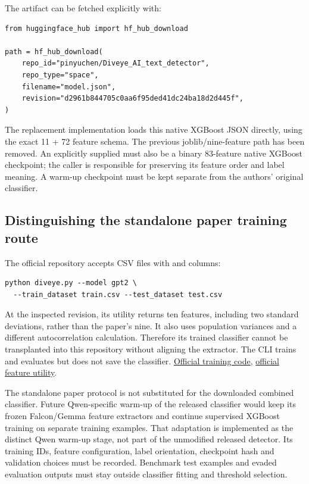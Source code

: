 The artifact can be fetched explicitly with:

\begin{Verbatim}
from huggingface_hub import hf_hub_download

path = hf_hub_download(
    repo_id="pinyuchen/Diveye_AI_text_detector",
    repo_type="space",
    filename="model.json",
    revision="d2961b844705c0aa6f95ded41dc24ba18d2d445f",
)
\end{Verbatim}

The replacement implementation loads this native XGBoost JSON directly,
using the exact 11 + 72 feature schema. The previous joblib/nine-feature
path has been removed. An explicitly supplied
\texttt{} must also be a binary 83-feature
native XGBoost checkpoint; the caller is responsible for preserving its
feature order and label meaning. A warm-up checkpoint must be kept
separate from the authors' original classifier.

\subsection{Distinguishing the standalone paper training
route}\label{record-docs-diveye-classifier-md-distinguishing-the-standalone-paper-training-route}

The official repository accepts CSV files with \texttt{}
and \texttt{} columns:

\begin{Verbatim}
python diveye.py --model gpt2 \
  --train_dataset train.csv --test_dataset test.csv
\end{Verbatim}

At the inspected revision, its utility returns ten features, including
two standard deviations, rather than the paper's nine. It also uses
population variances and a different autocorrelation calculation.
Therefore its trained classifier cannot be transplanted into this
repository without aligning the extractor. The CLI trains and evaluates
but does not save the classifier.
\href{https://github.com/IBM/diveye/blob/ee7d53abfb56ea4dc4cac2cb24e17beec0146e5e/diveye.py}{Official
training code},
\href{https://github.com/IBM/diveye/blob/ee7d53abfb56ea4dc4cac2cb24e17beec0146e5e/diveye_utils.py}{official
feature utility}.

The standalone paper protocol is not substituted for the downloaded
combined classifier. Future Qwen-specific warm-up of the released
classifier would keep its frozen Falcon/Gemma feature extractors and
continue supervised XGBoost training on separate training examples. That
adaptation is implemented as the distinct Qwen warm-up stage, not part
of the unmodified released detector. Its training IDs, feature
configuration, label orientation, checkpoint hash and validation choices
must be recorded. Benchmark test examples and evaded evaluation outputs
must stay outside classifier fitting and threshold selection.

